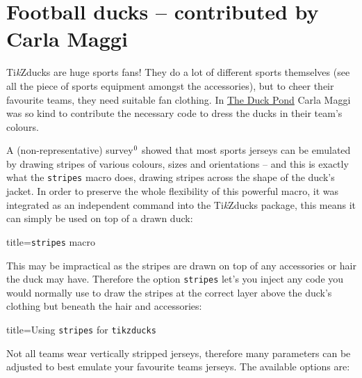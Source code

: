 \documentclass[parskip=half]{scrartcl}
\newcommand{\tikzducks}{Ti\emph{k}Zducks\xspace}
\begin{document}
\clearpage
\section{Football ducks -- contributed by Carla Maggi}
\label{sec:footballducks}

\tikzducks are huge sports fans! They do a lot of different sports themselves (see all the piece of sports equipment amongst the accessories), but to cheer their favourite teams, they need suitable fan clothing. In \href{https://tex.stackexchange.com/a/387126/36296}{The Duck Pond} Carla Maggi was so kind to contribute the necessary code to dress the ducks in their team's colours.

\addtocounter{footnote}{1}
A (non-representative) survey$^{\thefootnote}$ showed that most sports jerseys can be emulated by drawing stripes of various colours, sizes and orientations -- and this is exactly what the \lstinline|stripes| macro does, drawing stripes across the shape of the duck's jacket. In order to preserve the whole flexibility of this powerful macro, it was integrated as an independent command into the \tikzducks package, this means it can simply be used on top of a drawn duck:

\begin{tcblisting}{title={\texttt{stripes} macro}}
\begin{tikzpicture}
	\duck
	\stripes
\end{tikzpicture}
\end{tcblisting}

This may be impractical as the stripes are drawn on top of any accessories or hair the duck may have. Therefore the option \lstinline|stripes| let's you inject any code you would normally use to draw the stripes at the correct layer above the duck's clothing but beneath the hair and accessories:

\begin{tcblisting}{title={Using \texttt{stripes} for \texttt{tikzducks}}}
\begin{tikzpicture}
	\duck[longhair,|stripes|={\stripes}]
\end{tikzpicture}
\end{tcblisting}

Not all teams wear vertically stripped jerseys, therefore many parameters can be adjusted to best emulate your favourite teams jerseys. The available options are:
\end{document}
